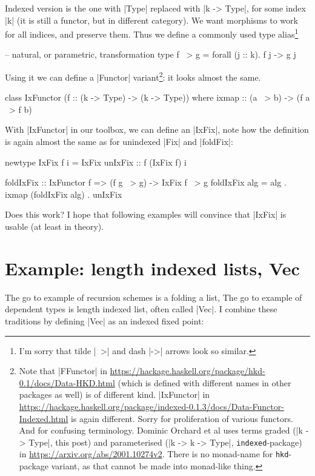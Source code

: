 Indexed version is the one with |Type| replaced with |k -> Type|,
for some index |k| (it is still a functor, but in different category).
We want morphisms to work for all indices,
and preserve them. Thus we define a commonly used type alias\footnote{I'm sorry that tilde |~>| and dash |->| arrows look so similar.}
\begin{code}
-- natural, or parametric, transformation
type f ~> g = forall (j :: k). f j -> g j
\end{code}
Using it we can define a |Functor| variant\footnote{
Note that |FFunctor| in \url{https://hackage.haskell.org/package/hkd-0.1/docs/Data-HKD.html} (which is defined with different names in other packages as well)
is of different kind.
|IxFunctor| in \url{https://hackage.haskell.org/package/indexed-0.1.3/docs/Data-Functor-Indexed.html}
is again different.
Sorry for proliferation of various functors.
And for confusing terminology. 
Dominic Orchard et al uses terms graded (|k -> Type|, this post) and parameterised (|k -> k -> Type|, \texttt{indexed}-package) in \url{https://arxiv.org/abs/2001.10274v2}.
There is no monad-name for \texttt{hkd}-package variant, as that cannot be made into monad-like thing.
}:
it looks almost the same.
\begin{code}
class IxFunctor (f :: (k -> Type) -> (k -> Type)) where
    ixmap :: (a ~> b) -> (f a ~> f b)
\end{code}

With |IxFunctor| in our toolbox, we can define an |IxFix|,
note how the definition is again almost the same as for unindexed |Fix| and |foldFix|:
\begin{code}
newtype IxFix f i = IxFix { unIxFix :: f (IxFix f) i }

foldIxFix :: IxFunctor f => (f g ~> g) -> IxFix f ~> g
foldIxFix alg = alg . ixmap (foldIxFix alg) . unIxFix
\end{code}

Does this work?
I hope that following examples will convince that |IxFix|
is usable (at least in theory).

\section{Example: length indexed lists, Vec}

The go to example of recursion schemes is a folding a list,
The go to example of dependent types is length indexed list, often called |Vec|.
I combine these traditions by defining |Vec| as an indexed fixed point:

